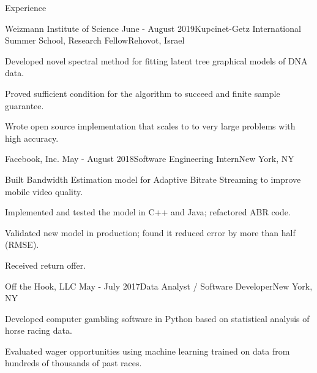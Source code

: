 \documentclass{resume} %
\begin{document}
\begin{rSection}{Experience}
\begin{rSubsection}{Weizmann Institute of Science} {June - August 2019}{Kupcinet-Getz International Summer School, Research Fellow}{Rehovot, Israel}
\item Developed novel spectral method for fitting latent tree graphical models of DNA data.
\item Proved sufficient condition for the algorithm to succeed and finite sample guarantee.
\item Wrote open source implementation that scales to to very large problems with high accuracy.

\end{rSubsection}  


\begin{rSubsection}{Facebook, Inc.} {May - August 2018}{Software Engineering Intern}{New York, NY}

\item Built Bandwidth Estimation model for Adaptive Bitrate Streaming to improve mobile video quality.
\item Implemented and tested the model in C++ and Java; refactored ABR code.
\item Validated new model in production; found it reduced error by more than half (RMSE).
\item Received return offer.

\end{rSubsection}  


\begin{rSubsection}{Off the Hook, LLC} {May - July 2017}{Data Analyst / Software Developer}{New York, NY}

\item Developed computer gambling software in Python based on statistical analysis of horse racing data.
\item Evaluated wager opportunities using machine learning trained on data from hundreds of thousands of past races. 

\end{rSubsection}  





\end{rSection}
\end{document}
